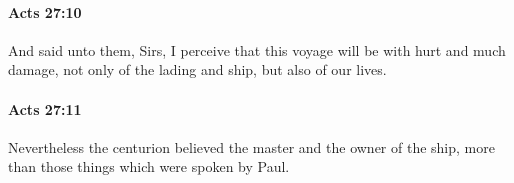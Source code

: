 		\paragraph{Acts 27:10} %
			\label{ACTS-27-10}

			And said unto them, Sirs, I perceive that this voyage will be with hurt and much damage, not only of the lading and ship, but also of our lives.

			\begin{framed}
			\scriptsize
				\begin{compactdesc}
					\item[SBLG] 
				\end{compactdesc}
			\end{framed}

		\paragraph{Acts 27:11} %
			\label{ACTS-27-11}

			Nevertheless the centurion believed the master and the owner of the ship, more than those things which were spoken by Paul.

